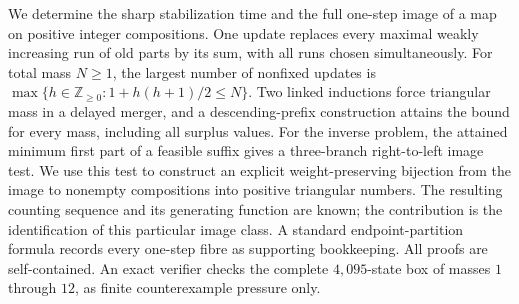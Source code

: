 We determine the sharp stabilization time and the full one-step image of a
map on positive integer compositions. One update replaces every maximal
weakly increasing run of old parts by its sum, with all runs chosen
simultaneously. For total mass $N\ge1$, the largest number of nonfixed
updates is $\max\{h\in\mathbb Z_{\ge0}:1+h(h+1)/2\le N\}$. Two linked inductions force
triangular mass in a delayed merger, and a descending-prefix construction
attains the bound for every mass, including all surplus values. For the
inverse problem, the attained minimum first part of a feasible suffix
gives a three-branch right-to-left image test. We use this test to construct
an explicit weight-preserving bijection from the image to nonempty
compositions into positive triangular numbers. The resulting counting
sequence and its generating function are known; the contribution is the
identification of this particular image class. A standard endpoint-partition
formula records every one-step fibre as supporting bookkeeping. All proofs
are self-contained. An exact verifier checks the complete $4{,}095$-state
box of masses $1$ through $12$, as finite counterexample pressure only.
